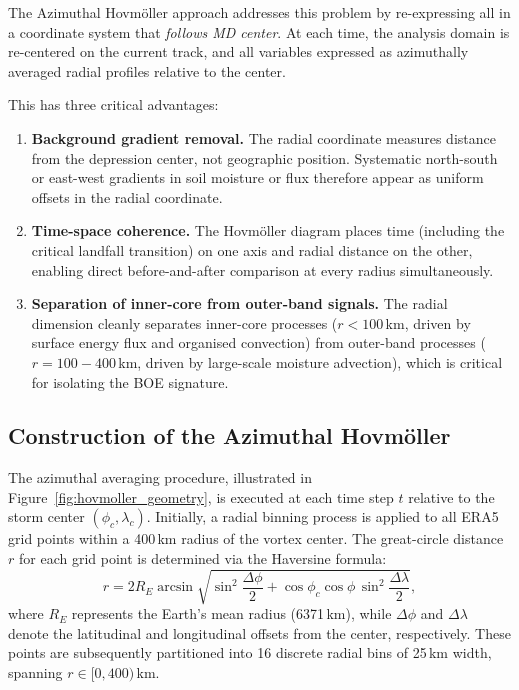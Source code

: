 The Azimuthal Hovm\"{o}ller approach addresses this problem by
re-expressing all in a coordinate system that \emph{follows MD
center}. At each time, the analysis domain is re-centered on the
current track, and all variables expressed as azimuthally averaged
radial profiles relative to the center.

This has three critical advantages:
\begin{enumerate}
  \item \textbf{Background gradient removal.} The radial coordinate
    measures distance from the depression center, not geographic
    position. Systematic north-south or east-west gradients in soil
    moisture or flux therefore appear as uniform offsets in the
    radial coordinate.
  \item \textbf{Time-space coherence.} The Hovm\"{o}ller diagram
    places time (including the critical landfall transition) on one
    axis and radial distance on the other, enabling direct
    before-and-after comparison at every radius simultaneously.
  \item \textbf{Separation of inner-core from outer-band signals.}
    The radial dimension cleanly separates inner-core processes ($r <
    100$\,km, driven by surface energy flux and organised convection)
    from outer-band processes ($r = 100-400$\,km, driven by
    large-scale moisture advection), which is critical for isolating
    the BOE signature.
\end{enumerate}

\subsection{Construction of the Azimuthal Hovm\"{o}ller}
\label{subsec:hovmoller_construction}

The azimuthal averaging procedure, illustrated in
Figure~\ref{fig:hovmoller_geometry}, is executed at each time step
$t$ relative to the storm center $(\phi_c, \lambda_c)$. Initially, a
radial binning process is applied to all ERA5 grid points within a
400\,km radius of the vortex center. The great-circle distance $r$
for each grid point is determined via the Haversine formula:
\begin{equation}
  r = 2R_E \arcsin\!\sqrt{\sin^2\!\frac{\Delta\phi}{2} +
  \cos\phi_c\cos\phi\,\sin^2\!\frac{\Delta\lambda}{2}},
  \label{eq:haversine}
\end{equation}
where $R_E$ represents the Earth’s mean radius (6371\,km), while
$\Delta\phi$ and $\Delta\lambda$ denote the latitudinal and
longitudinal offsets from the center, respectively. These points are
subsequently partitioned into 16 discrete radial bins of 25\,km
width, spanning $r \in [0, 400)$\,km.

